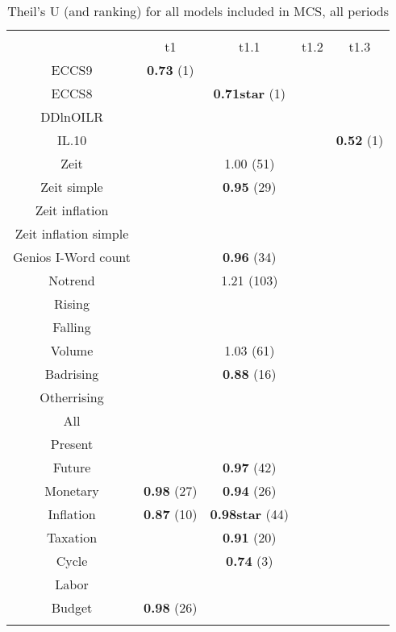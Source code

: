 
\begin{table}[!htbp] \centering 
  \caption{Theil's U (and ranking) for all models included in MCS, all periods} 
  \label{} 
\scriptsize 
\begin{tabular}{@{\extracolsep{5pt}} ccccc} 
\\[-1.8ex]\hline 
\hline \\[-1.8ex] 
 & t1 & t1.1 & t1.2 & t1.3 \\ 
ECCS9 & \textbf{0.73} (1) &  &  &  \\ 
ECCS8 &  & \textbf{0.71star} (1) &  &  \\ 
DDlnOILR &  &  & \textbf{} &  \\ 
IL.10 &  &  &  & \textbf{0.52} (1) \\ 
Zeit &  & 1.00 (51) &  & \textbf{} \\ 
Zeit simple &  & \textbf{0.95} (29) &  & \textbf{} \\ 
Zeit inflation &  &  &  & \textbf{} \\ 
Zeit inflation simple &  &  &  & \textbf{} \\ 
Genios I-Word count &  & \textbf{0.96} (34) &  &  \\ 
Notrend &  & 1.21 (103) &  & \textbf{} \\ 
Rising &  &  &  & \textbf{} \\ 
Falling &  &  &  &  \\ 
Volume &  & 1.03 (61) &  &  \\ 
Badrising &  & \textbf{0.88} (16) &  &  \\ 
Otherrising &  &  &  &  \\ 
All &  &  &  &  \\ 
Present &  &  &  & \textbf{} \\ 
Future &  & \textbf{0.97} (42) &  &  \\ 
Monetary & \textbf{0.98} (27) & \textbf{0.94} (26) &  &  \\ 
Inflation & \textbf{0.87} (10) & \textbf{0.98star} (44) &  & \textbf{} \\ 
Taxation &  & \textbf{0.91} (20) &  &  \\ 
Cycle &  & \textbf{0.74} (3) &  &  \\ 
Labor &  &  &  & \textbf{} \\ 
Budget & \textbf{0.98} (26) &  &  &  \\ 
\hline \\[-1.8ex] 
\end{tabular} 
\end{table} 
